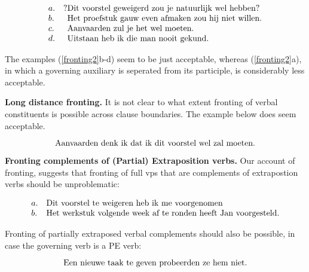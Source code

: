 \begin{equation}
\label{fronting2}
\begin{array}[t]{ll@{\hspace{0cm}}l}
a. &?& \mbox{Dit voorstel geweigerd zou je natuurlijk wel hebben?} \\
b. && \mbox{Het proefstuk gauw even afmaken zou hij niet willen.} \\
c. && \mbox{Aanvaarden zul je het wel moeten.} \\
d. && \mbox{Uitstaan heb ik die man nooit gekund.} \\
\end{array} 
\end{equation}

The examples (\ref{fronting2}b-d) seem to be just acceptable, whereas 
(\ref{fronting2}a), in which a governing auxiliary is seperated from its 
participle,
is considerably less acceptable. 

{\bf Long distance fronting.} It is not clear to what extent fronting of verbal 
constituents is possible across clause boundaries. The example below does seem 
acceptable. 

\begin{equation}
\mbox{Aanvaarden denk ik dat ik dit voorstel wel zal moeten.} \\
\end{equation}


{\bf Fronting complements of (Partial) Extraposition verbs.}
Our account of fronting, suggests that fronting of full {\sc vp}s that are 
complements of extrapostion verbs should be unproblematic:

\begin{equation}
\begin{array}[t]{ll@{\hspace{0cm}}l}
a. && \mbox{Dit voorstel te weigeren heb ik me voorgenomen} \\
b. && \mbox{Het werkstuk volgende week af te ronden heeft Jan voorgesteld.} \\
\end{array} 
\end{equation} 

\noindent Fronting of partially extraposed verbal complements should also be 
possible, in case the governing verb is a PE verb:

\begin{equation}
\mbox{Een nieuwe taak te geven probeerden ze hem niet.} \\
\end{equation} 



